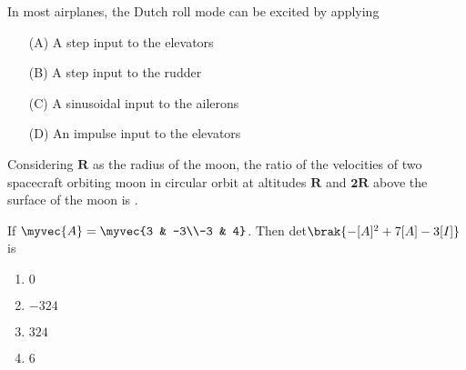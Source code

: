 \vspace{0.5cm}

\item In most airplanes, the Dutch roll mode can be excited by applying
\begin{multicols}{2}
\begin{itemize}
    \item[(A)] A step input to the elevators
    \item[(B)] A step input to the rudder
    \item[(C)] A sinusoidal input to the ailerons
    \item[(D)] An impulse input to the elevators
\end{itemize}
\end{multicols}

\vspace{0.5cm}

\item Considering $\mathbf{R}$ as the radius of the moon, the ratio of the velocities of two spacecraft orbiting moon in circular orbit at altitudes $\mathbf{R}$ and $\mathbf{2R}$ above the surface of the moon is \underline{\hspace{2cm}}.
\vspace{0.5cm}

\item If $\myvec{A}=\myvec{3 & -3\\-3 & 4}$. Then det$\brak{-[A]^2+7[A]-3[I]}$ is
\begin{multicols}{2}
\begin{enumerate}
    \item $0$
    \item $-324$
    \item $324$
    \item $6$
\end{enumerate}
\end{multicols}
